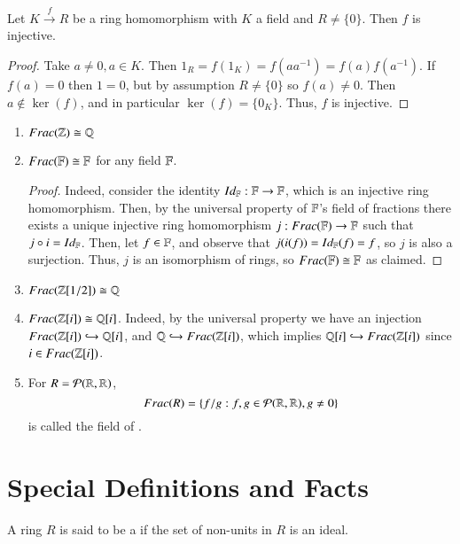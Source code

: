 \begin{lemma}
    Let $K\xrightarrow{f} R$ be a ring homomorphism with $K$ a field and $R \neq \{0\}$. Then $f$ is injective.
    \begin{proof}
        Take $a \neq 0, a \in K$. Then $1_R = f(1_K) = f(aa^{-1}) = f(a)f(a^{-1})$. If $f(a) = 0$ then $1 = 0$, but by assumption $R \neq \{0\}$ so $f(a) \neq 0$. Then $a \notin \ker(f)$, and in particular $\ker(f) = \{0_K\}$. Thus, $f$ is injective.
    \end{proof}
\end{lemma}

\begin{example}
    \leavevmode
    \begin{enumerate}
        \item $Frac(\mathbb Z) \cong \mathbb Q$
        \item $Frac(\mathbb F) \cong \mathbb F$ for any field $\mathbb F$.
        \begin{proof}
            Indeed, consider the identity $Id_{\mathbb F}:\mathbb F\rightarrow \mathbb F$, which is an injective ring homomorphism. Then, by the universal property of $\mathbb F$'s field of fractions there exists a unique injective ring homomorphism $j:Frac(\mathbb F) \rightarrow \mathbb F$ such that $j \circ i = Id_{\mathbb F}$. Then, let $f \in \mathbb F$, and observe that $j(i(f)) = Id_{\mathbb F}(f) = f$, so $j$ is also a surjection. Thus, $j$ is an isomorphism of rings, so $Frac(\mathbb F) \cong \mathbb F$ as claimed.
        \end{proof}
        \item $Frac(\mathbb Z[1/2]) \cong \mathbb Q$
        \item $Frac(\mathbb Z[i]) \cong \mathbb Q[i]$. Indeed, by the universal property we have an injection $Frac(\mathbb Z[i])\hookrightarrow \mathbb Q[i]$, and $\mathbb Q \hookrightarrow Frac(\mathbb Z[i])$, which implies $\mathbb Q[i] \hookrightarrow Frac(\mathbb Z[i])$ since $i \in Frac(\mathbb Z[i])$.
        \item For $R = \mathcal{P}(\mathbb R,\mathbb R)$, \begin{equation}
            Frac(R) = \{f/g: f,g \in \mathcal{P}(\mathbb R,\mathbb R), g \neq 0\}
        \end{equation}
        is called the field of .
    \end{enumerate}
\end{example}


\section{ Special Definitions and Facts}

\begin{definition}
    A ring $R$ is said to be a  if the set of non-units in $R$ is an ideal.
\end{definition}

